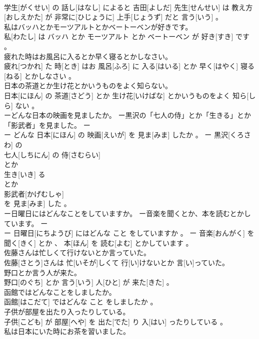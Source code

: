 \documentclass[8pt]{extreport}
\begin{document}
\begin{CJK}{UTF8}{min}
\\	学生[がくせい] の 話し[はなし] によると 吉田[よしだ] 先生[せんせい] は 教え方[おしえかた] が 非常に[ひじょうに] 上手[じょうず] だと 言う[いう] 。
\\	私はバッハとかモーツアルトとかベートーベンが好きです。	
\\	私[わたし] は バッハ とか モーツアルト とか ベートーベン が 好き[すき] です 。
\\	疲れた時はお風呂に入るとか早く寝るとかしなさい。	
\\	疲れ[つかれ] た 時[とき] はお 風呂[ふろ] に 入る[はいる] とか 早く[はやく] 寝る[ねる] とかしなさい 。
\\	日本の茶道とか生け花とかいうものをよく知らない。	
\\	日本[にほん] の 茶道[さどう] とか 生け花[いけばな] とかいうものをよく 知ら[しら] ない 。
\\	ーどんな日本の映画を見ましたか。 ー黒沢の「七人の侍」とか「生きる」とか「影武者」を見ました。	ー
\\	ー どんな 日本[にほん] の 映画[えいが] を 見ま[みま] したか 。 ー 黒沢[くろさわ] の 
\\	七人[しちにん] の 侍[さむらい] 
\\	とか 
\\	生き[いき] る 
\\	とか 
\\	影武者[かげむしゃ] 
\\	を 見ま[みま] した 。
\\	ー日曜日にはどんなことをしていますか。 ー音楽を聞くとか、本を読むとかしています。	ー
\\	ー 日曜日[にちようび] にはどんな こと をしていますか 。 ー 音楽[おんがく] を 聞く[きく] とか 、 本[ほん] を 読む[よむ] とかしています 。
\\	佐藤さんは忙しくて行けないとか言っていた。	
\\	佐藤[さとう]さんは 忙[いそが]しくて 行[い]けないとか 言[い]っていた。
\\	野口とか言う人が来た。	
\\	野口[のぐち] とか 言う[いう] 人[ひと] が 来た[きた] 。
\\	函館ではどんなことをしましたか。	
\\	函館[はこだて] ではどんな こと をしましたか 。
\\	子供が部屋を出たり入ったりしている。	
\\	子供[こども] が 部屋[へや] を 出た[でた] り 入[はい] ったりしている 。
\\	私は日本にいた時にお茶を習いました。	

\end{CJK}
\end{document}
